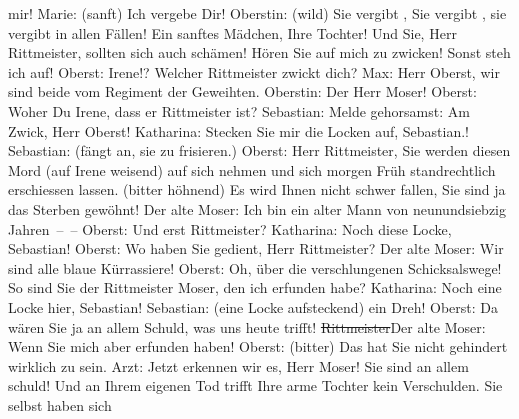 \documentclass[twoside=false,titlepage=false,open=any, parskip=never, fontsize=12pt, headings=small, chapterprefix=false, appendixprefix=false]{scrbook}
\newcommand{\strikeout}[1]{\sout{#1}}
\newcommand{\Theight}{\dimexpr\fontcharht\font`W}
\newcommand{\pbposition}{\depth}
\newcommand{\pb}{\nobreak\hspace{0pt}\raisebox{-0.1em}{\raisebox{\pbposition}{\textnormal{|}}}\nobreak\hspace{0pt}}
\newcommand{\introOben}{\textnormal{\raisebox{\Theight}{\raisebox{-\height}{\small{v}\normalsize}}}}
\begin{document}
					mir!\pend
           \pstart
           Marie: (sanft) Ich vergebe Dir!\pend
           \pstart
           Oberstin: (wild) Sie vergibt , Sie vergibt , sie vergibt in allen Fällen! Ein sanftes
					Mädchen, Ihre Tochter! Und Sie, Herr Rittmeister, sollten sich auch schämen!
					Hören Sie auf mich zu zwicken! Sonst steh ich auf!\pend
           \pstart
           Oberst: Irene!? Welcher Rittmeister zwickt dich?\pend
           \pstart
           Max: Herr Oberst, wir sind beide vom Regiment der Geweihten.\pend
           \pstart
           Oberstin: Der Herr Moser!\pend
           \pstart
           Oberst: Woher \label{T_L01900_1v}\label{T_L01900_1h} Du Irene, dass er Rittmeister
					ist?\pend
           \pstart
           Sebastian: Melde gehorsamst: Am Zwick, Herr Oberst!\pend
           \pstart
           Katharina: Stecken Sie mir die Locken auf, Sebastian.!\pend
           \pstart
           Sebastian: (fängt an, sie zu frisieren.)\pend
           \pstart
           Oberst: Herr Rittmeister, Sie werden diesen Mord (auf Irene weisend) auf sich
					nehmen und sich morgen Früh standrechtlich erschiessen lassen. (bitter höhnend)
					Es wird Ihnen nicht schwer fallen, Sie sind ja das Sterben gewöhnt!\pend
           \pstart
           Der alte Moser: Ich bin ein alter Mann von neunundsiebzig Jahren – –\pend
           \pstart
           {\pb}Oberst: Und erst
					Rittmeister?\pend
           \pstart
           Katharina: Noch diese Locke, Sebastian!\pend
           \pstart
           Oberst: Wo haben Sie gedient, Herr Rittmeister?\pend
           \pstart
           Der alte Moser: Wir sind alle blaue Kürrassiere!\pend
           \pstart
           Oberst: Oh, über die verschlungenen Schicksalswege! So sind Sie der Rittmeister
					Moser, den ich erfunden habe?\pend
           \pstart
           Katharina: Noch eine Locke hier, Sebastian!\pend
           \pstart
           Sebastian: (eine Locke aufsteckend)  ein Dreh!\pend
           \pstart
           Oberst: Da wären Sie ja an allem Schuld, was uns heute trifft!\pend
           \pstart
           \introOben{}\strikeout{Rittmeister}\introOben{}Der alte Moser: Wenn Sie mich aber erfunden haben!\pend
           \pstart
           Oberst: (bitter) Das hat Sie nicht gehindert wirklich zu sein.\pend
           \pstart
           Arzt: Jetzt erkennen wir es, Herr Moser! Sie sind an allem schuld! Und an Ihrem
					eigenen Tod trifft Ihre arme Tochter kein Verschulden. Sie selbst haben sich
\end{document}
